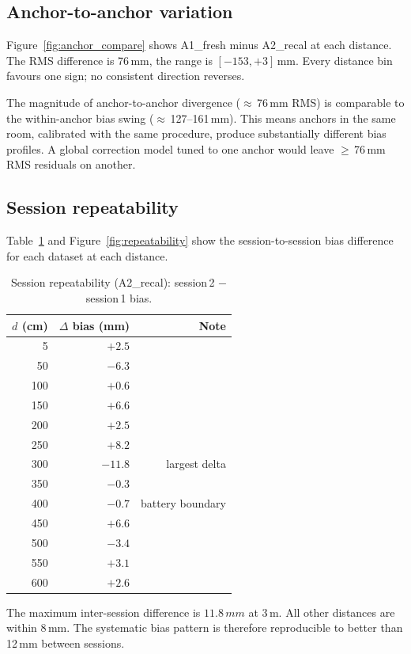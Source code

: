 \documentclass[10pt,a4paper,twocolumn]{article}
\begin{document}
\subsection{Anchor-to-anchor variation}

Figure~\ref{fig:anchor_compare} shows A1\_fresh minus A2\_recal at each
distance.  The RMS difference is 76\,mm, the range is
$[-153, +3]$\,mm.  Every distance bin favours one sign; no consistent
direction reverses.

The magnitude of anchor-to-anchor divergence ($\approx$\,76\,mm RMS) is
comparable to the within-anchor bias swing ($\approx$\,127--161\,mm).
This means anchors in the same room, calibrated with the same procedure,
produce substantially different bias profiles.  A global correction model
tuned to one anchor would leave $\geq$\,76\,mm\,RMS residuals on another.

\subsection{Session repeatability}

Table~\ref{tab:repeatability} and Figure~\ref{fig:repeatability} show the
session-to-session bias difference for each dataset at each distance.

\begin{table}[H]
\centering
\caption{Session repeatability (A2\_recal): session\,2 $-$ session\,1 bias.}
\label{tab:repeatability}
\begin{tabular}{rrr}
\toprule
$d$ (cm) & $\Delta$ bias (mm) & Note \\
\midrule
  5 & $+2.5$ & \\
 50 & $-6.3$ & \\
100 & $+0.6$ & \\
150 & $+6.6$ & \\
200 & $+2.5$ & \\
250 & $+8.2$ & \\
300 & $-11.8$ & largest delta \\
350 & $-0.3$ & \\
400 & $-0.7$ & battery boundary \\
450 & $+6.6$ & \\
500 & $-3.4$ & \\
550 & $+3.1$ & \\
600 & $+2.6$ & \\
\bottomrule
\end{tabular}
\end{table}

The maximum inter-session difference is $11.8\,mm$ at 3\,m.
All other distances are within 8\,mm.  The systematic bias pattern is
therefore reproducible to better than 12\,mm between sessions.
\end{document}
